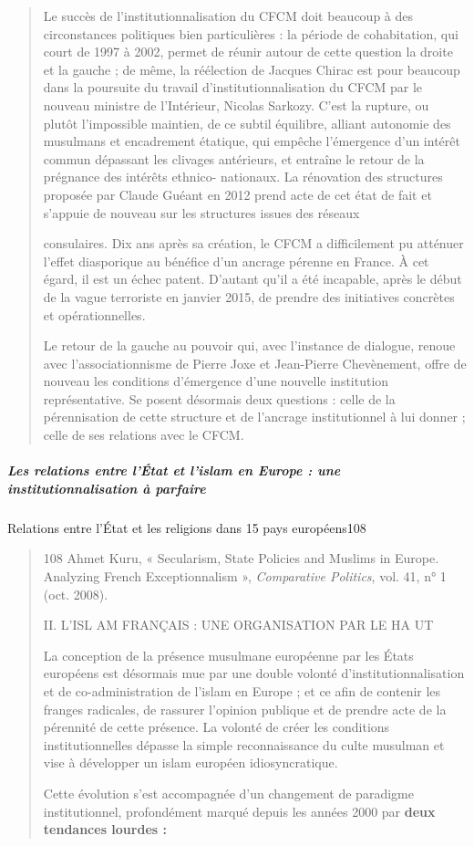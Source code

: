 \begin{quote}
Le succès de l'institutionnalisation du CFCM doit beaucoup à des
circonstances politiques bien particulières : la période de
cohabitation, qui court de 1997 à 2002, permet de réunir autour de cette
question la droite et la gauche ; de même, la réélection de Jacques
Chirac est pour beaucoup dans la poursuite du travail
d'institutionnalisation du CFCM par le nouveau ministre de l'Intérieur,
Nicolas Sarkozy. C'est la rupture, ou plutôt l'impossible maintien, de
ce subtil équilibre, alliant autonomie des musulmans et encadrement
étatique, qui empêche l'émergence d'un intérêt commun dépassant les
clivages antérieurs, et entraîne le retour de la prégnance des intérêts
ethnico- nationaux. La rénovation des structures proposée par Claude
Guéant en 2012 prend acte de cet état de fait et s'appuie de nouveau sur
les structures issues des réseaux



consulaires. Dix ans après sa création, le CFCM a difficilement pu
atténuer l'effet diasporique au bénéfice d'un ancrage pérenne en France.
À cet égard, il est un échec patent. D'autant qu'il a été incapable,
après le début de la vague terroriste en janvier 2015, de prendre des
initiatives concrètes et opérationnelles.

Le retour de la gauche au pouvoir qui, avec l'instance de dialogue,
renoue avec l'associationnisme de Pierre Joxe et Jean-Pierre
Chevènement, offre de nouveau les conditions d'émergence d'une nouvelle
institution représentative. Se posent désormais deux questions : celle
de la pérennisation de cette structure et de l'ancrage institutionnel à
lui donner ; celle de ses relations avec le CFCM.
\end{quote}

\hypertarget{les-relations-entre-luxe9tat-et-lislam-en-europe-une-institutionnalisation-uxe0-parfaire}{%
\subparagraph{Les relations entre l'État et l'islam en Europe : une
institutionnalisation à
parfaire}\label{les-relations-entre-luxe9tat-et-lislam-en-europe-une-institutionnalisation-uxe0-parfaire}}

Relations entre l'État et les religions dans 15 pays européens108

\begin{quote}
108 Ahmet Kuru, « Secularism, State Policies and Muslims in Europe.
Analyzing French Exceptionnalism », \emph{Comparative Politics}, vol.
41, n° 1 (oct. 2008).

II. L'ISL AM FRANÇAIS : UNE ORGANISATION PAR LE HA UT

La conception de la présence musulmane européenne par les États
européens est désormais mue par une double volonté
d'institutionnalisation et de co-administration de l'islam en Europe ;
et ce afin de contenir les franges radicales, de rassurer l'opinion
publique et de prendre acte de la pérennité de cette présence. La
volonté de créer les conditions institutionnelles dépasse la simple
reconnaissance du culte musulman et vise à développer un islam européen
idiosyncratique.

Cette évolution s'est accompagnée d'un changement de paradigme
institutionnel, profondément marqué depuis les années 2000 par
\textbf{deux tendances lourdes :}
\end{quote}

